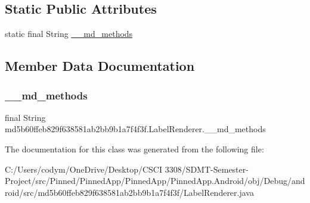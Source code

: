 \subsection*{Static Public Attributes}
\begin{DoxyCompactItemize}
\item 
static final String \hyperlink{classmd5b60ffeb829f638581ab2bb9b1a7f4f3f_1_1_label_renderer_a6d75a8c95caaa11a9bbc9581bb0151b3}{\+\_\+\+\_\+md\+\_\+methods}
\end{DoxyCompactItemize}


\subsection{Member Data Documentation}
\mbox{\label{classmd5b60ffeb829f638581ab2bb9b1a7f4f3f_1_1_label_renderer_a6d75a8c95caaa11a9bbc9581bb0151b3}} 
\subsubsection{\texorpdfstring{\+\_\+\+\_\+md\+\_\+methods}{\_\_md\_methods}}
{\footnotesize\ttfamily final String md5b60ffeb829f638581ab2bb9b1a7f4f3f.\+Label\+Renderer.\+\_\+\+\_\+md\+\_\+methods\hspace{0.3cm}{\ttfamily [static]}}



The documentation for this class was generated from the following file\+:\begin{DoxyCompactItemize}
\item 
C\+:/\+Users/codym/\+One\+Drive/\+Desktop/\+C\+S\+C\+I 3308/\+S\+D\+M\+T-\/\+Semester-\/\+Project/src/\+Pinned/\+Pinned\+App/\+Pinned\+App/\+Pinned\+App.\+Android/obj/\+Debug/android/src/md5b60ffeb829f638581ab2bb9b1a7f4f3f/Label\+Renderer.\+java\end{DoxyCompactItemize}
